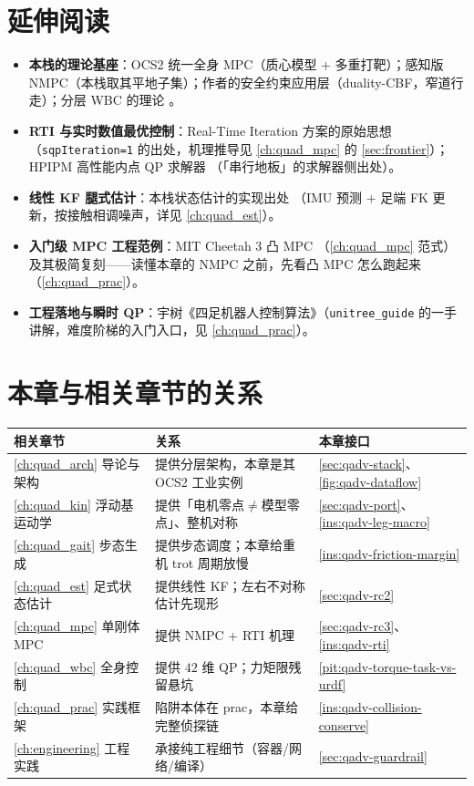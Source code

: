 \section*{延伸阅读}
\begin{itemize}
  \item \textbf{本栈的理论基座}：OCS2 统一全身 MPC（质心模型 + 多重打靶）\cite{sleiman2021unified}；感知版 NMPC（本栈取其平地子集）\cite{grandia2022perceptive}；作者的安全约束应用层（duality-CBF，窄道行走）\cite{liao2023walking}；分层 WBC 的理论 \cite{bellicoso2016whole}。
  \item \textbf{RTI 与实时数值最优控制}：Real-Time Iteration 方案的原始思想 \cite{diehl2002rti}（\texttt{sqpIteration=1} 的出处，机理推导见 \cref{ch:quad_mpc} 的 \cref{sec:frontier}）；HPIPM 高性能内点 QP 求解器 \cite{frison2020hpipm}（「串行地板」的求解器侧出处）。
  \item \textbf{线性 KF 腿式估计}：本栈状态估计的实现出处 \cite{flayols2017experimental}（IMU 预测 + 足端 FK 更新，按接触相调噪声，详见 \cref{ch:quad_est}）。
  \item \textbf{入门级 MPC 工程范例}：MIT Cheetah 3 凸 MPC \cite{dicarlo2018cheetah}（\cref{ch:quad_mpc} 范式）及其极简复刻——读懂本章的 NMPC 之前，先看凸 MPC 怎么跑起来（\cref{ch:quad_prac}）。
  \item \textbf{工程落地与瞬时 QP}：宇树《四足机器人控制算法》\cite{unitree2023quadruped}（\texttt{unitree\_guide} 的一手讲解，难度阶梯的入门入口，见 \cref{ch:quad_prac}）。
\end{itemize}

\section*{本章与相关章节的关系}
\begin{table}[H]\centering\small
\begin{tabular}{lll}
\toprule
相关章节 & 关系 & 本章接口 \\
\midrule
\cref{ch:quad_arch} 导论与架构 & 提供分层架构，本章是其 OCS2 工业实例 & \cref{sec:qadv-stack}、\cref{fig:qadv-dataflow} \\
\cref{ch:quad_kin} 浮动基运动学 & 提供「电机零点$\neq$模型零点」、整机对称 & \cref{sec:qadv-port}、\cref{ins:qadv-leg-macro} \\
\cref{ch:quad_gait} 步态生成 & 提供步态调度；本章给重机 trot 周期放慢 & \cref{ins:qadv-friction-margin} \\
\cref{ch:quad_est} 足式状态估计 & 提供线性 KF；左右不对称估计先现形 & \cref{sec:qadv-rc2} \\
\cref{ch:quad_mpc} 单刚体 MPC & 提供 NMPC + RTI 机理 & \cref{sec:qadv-rc3}、\cref{ins:qadv-rti} \\
\cref{ch:quad_wbc} 全身控制 & 提供 $42$ 维 QP；力矩限残留悬坑 & \cref{pit:qadv-torque-task-vs-urdf} \\
\cref{ch:quad_prac} 实践框架 & 陷阱本体在 prac，本章给完整侦探链 & \cref{ins:qadv-collision-conserve} \\
\cref{ch:engineering} 工程实践 & 承接纯工程细节（容器/网络/编译）& \cref{sec:qadv-guardrail} \\
\bottomrule
\end{tabular}
\end{table}

